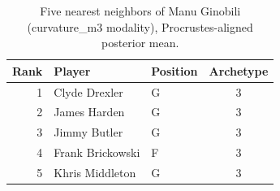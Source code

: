 \begin{table}[htbp]
  \centering\small
  \begin{tabular}{rllc}
    \toprule
    Rank & Player & Position & Archetype \\
    \midrule
    1 & Clyde Drexler & G & 3 \\
    2 & James Harden & G & 3 \\
    3 & Jimmy Butler & G & 3 \\
    4 & Frank Brickowski & F & 3 \\
    5 & Khris Middleton & G & 3 \\
    \bottomrule
  \end{tabular}
  \caption{Five nearest neighbors of Manu Ginobili (curvature_m3 modality), Procrustes-aligned posterior mean.}
  \label{tab:Manu_Ginobili_neighbors_curvature_m3}
\end{table}


